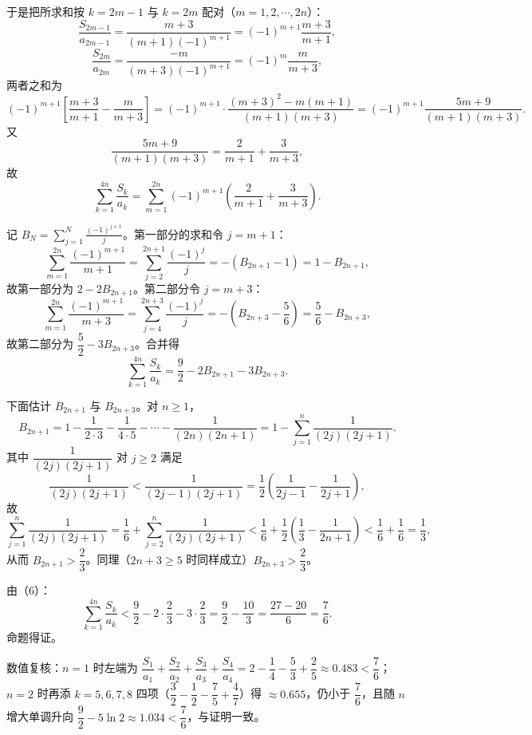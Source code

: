 \begin{answer}
于是把所求和按 $k=2m-1$ 与 $k=2m$ 配对（$m=1,2,\cdots,2n$）：
\nopagebreak[4]
\[\frac{S_{2m-1}}{a_{2m-1}}=\frac{m+3}{(m+1)(-1)^{m+1}}=(-1)^{m+1}\frac{m+3}{m+1},\]
\nopagebreak[4]
\[\frac{S_{2m}}{a_{2m}}=\frac{-m}{(m+3)(-1)^{m+1}}=(-1)^{m}\frac{m}{m+3},\]
两者之和为
\nopagebreak[4]
\[(-1)^{m+1}\left[\frac{m+3}{m+1}-\frac{m}{m+3}\right]=(-1)^{m+1}\cdot\frac{(m+3)^2-m(m+1)}{(m+1)(m+3)}=(-1)^{m+1}\frac{5m+9}{(m+1)(m+3)}.\]
又
\nopagebreak[4]
\[\frac{5m+9}{(m+1)(m+3)}=\frac{2}{m+1}+\frac{3}{m+3},\]
故
\nopagebreak[4]
\[\sum_{k=1}^{4n}\frac{S_k}{a_k}=\sum_{m=1}^{2n}(-1)^{m+1}\left(\frac{2}{m+1}+\frac{3}{m+3}\right).\]

记 $B_N=\displaystyle\sum_{j=1}^{N}\frac{(-1)^{j+1}}{j}$。第一部分的求和令 $j=m+1$：
\nopagebreak[4]
\[\sum_{m=1}^{2n}\frac{(-1)^{m+1}}{m+1}=\sum_{j=2}^{2n+1}\frac{(-1)^{j}}{j}=-\left(B_{2n+1}-1\right)=1-B_{2n+1},\]
故第一部分为 $2-2B_{2n+1}$。第二部分令 $j=m+3$：
\nopagebreak[4]
\[\sum_{m=1}^{2n}\frac{(-1)^{m+1}}{m+3}=\sum_{j=4}^{2n+3}\frac{(-1)^{j}}{j}=-\left(B_{2n+3}-\frac56\right)=\frac56-B_{2n+3},\]
故第二部分为 $\dfrac52-3B_{2n+3}$。合并得
\nopagebreak[4]
\[\sum_{k=1}^{4n}\frac{S_k}{a_k}=\frac92-2B_{2n+1}-3B_{2n+3}.\tag{6}\]

下面估计 $B_{2n+1}$ 与 $B_{2n+3}$。对 $n\geqslant1$，
\nopagebreak[4]
\[B_{2n+1}=1-\frac1{2\cdot3}-\frac1{4\cdot5}-\cdots-\frac1{(2n)(2n+1)}=1-\sum_{j=1}^{n}\frac1{(2j)(2j+1)}.\]
其中 $\dfrac1{(2j)(2j+1)}$ 对 $j\geqslant2$ 满足
\nopagebreak[4]
\[\frac1{(2j)(2j+1)}<\frac1{(2j-1)(2j+1)}=\frac12\left(\frac1{2j-1}-\frac1{2j+1}\right),\]
故
\nopagebreak[4]
\[\sum_{j=1}^{n}\frac1{(2j)(2j+1)}=\frac16+\sum_{j=2}^{n}\frac1{(2j)(2j+1)}<\frac16+\frac12\left(\frac13-\frac1{2n+1}\right)<\frac16+\frac16=\frac13,\]
从而 $B_{2n+1}>\dfrac23$。同理（$2n+3\geqslant5$ 时同样成立）$B_{2n+3}>\dfrac23$。

由（6）：
\nopagebreak[4]
\[\sum_{k=1}^{4n}\frac{S_k}{a_k}<\frac92-2\cdot\frac23-3\cdot\frac23=\frac92-\frac{10}{3}=\frac{27-20}{6}=\frac76.\]
命题得证。

数值复核：$n=1$ 时左端为 $\dfrac{S_1}{a_1}+\dfrac{S_2}{a_2}+\dfrac{S_3}{a_3}+\dfrac{S_4}{a_4}=2-\dfrac14-\dfrac53+\dfrac25\approx0.483<\dfrac76$；$n=2$ 时再添 $k=5,6,7,8$ 四项（$\dfrac32-\dfrac12-\dfrac75+\dfrac47$）得 $\approx0.655$，仍小于 $\dfrac76$，且随 $n$ 增大单调升向 $\dfrac92-5\ln2\approx1.034<\dfrac76$，与证明一致。


\end{answer}